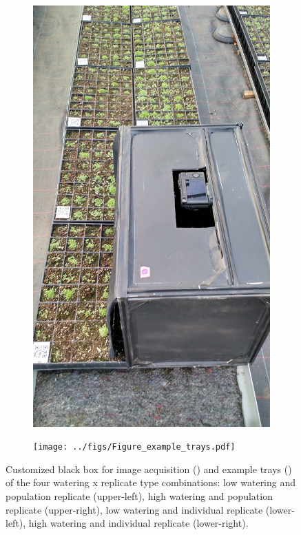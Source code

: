 \documentclass[12pt,]{article}
\begin{document}
\begin{figure}
  \centering
      \begin{subfigure}[b]{0.25\textwidth}
        \centering
        \includegraphics[width=\linewidth]{../figs/IMG_20151123_151811961_HDR.jpg}
        \caption{} \label{fig:photobox}
    \end{subfigure}
    \begin{subfigure}[b]{0.6\textwidth}
        \centering
        \texttt{[image: ../figs/Figure\_example\_trays.pdf]}
        \caption{} \label{fig:exampletrays}
    \end{subfigure}
    \caption{ Customized black box for image acquisition () and example trays  ()  of the four watering x replicate type combinations: low watering and population replicate (upper-left), high watering and population replicate (upper-right), low watering and individual replicate (lower-left), high watering and individual replicate (lower-right). }
    \label{fig:trays}
\end{figure}
\end{document}
